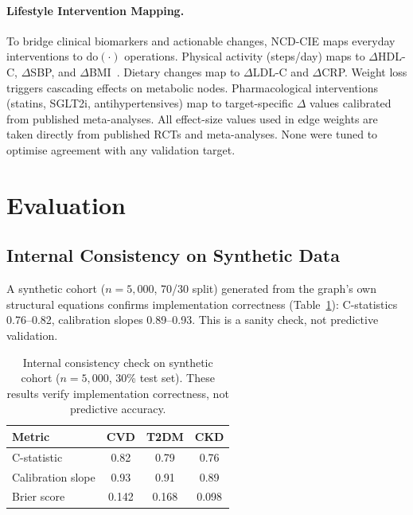 \documentclass[runningheads]{llncs}
\begin{document}
\paragraph{Lifestyle Intervention Mapping.}
To bridge clinical biomarkers and actionable changes, NCD-CIE maps
everyday interventions to $\mathrm{do}(\cdot)$ operations.
Physical activity (steps/day) maps to $\Delta$HDL-C, $\Delta$SBP,
and $\Delta$BMI~\cite{naci2018comparative}.
Dietary changes map to $\Delta$LDL-C and $\Delta$CRP\@.
Weight loss triggers cascading effects on metabolic nodes.
Pharmacological interventions (statins, SGLT2i, antihypertensives)
map to target-specific $\Delta$ values calibrated from published
meta-analyses.
All effect-size values used in edge weights are taken directly from
published RCTs and meta-analyses.
None were tuned to optimise agreement with any validation target.

\section{Evaluation}\label{sec:validation}

\subsection{Internal Consistency on Synthetic Data}\label{sec:synthetic}

A synthetic cohort ($n = 5{,}000$, 70/30 split) generated from the
graph's own structural equations confirms implementation correctness
(Table~\ref{tab:synthetic}): C-statistics 0.76--0.82, calibration
slopes 0.89--0.93.
This is a sanity check, not predictive validation.

\renewcommand{\arraystretch}{1.2}
\begin{table}[t]
\centering
\caption{Internal consistency check on synthetic cohort ($n = 5{,}000$,
30\% test set).  These results verify implementation correctness,
not predictive accuracy.}
\label{tab:synthetic}
\small
\begin{tabular}{@{}lccc@{}}
\toprule
\textbf{Metric} & \textbf{CVD} & \textbf{T2DM} & \textbf{CKD} \\
\midrule
C-statistic        & 0.82 & 0.79 & 0.76 \\
Calibration slope  & 0.93 & 0.91 & 0.89 \\
Brier score        & 0.142 & 0.168 & 0.098 \\
\bottomrule
\end{tabular}
\end{table}
\renewcommand{\arraystretch}{1.0}
\end{document}
